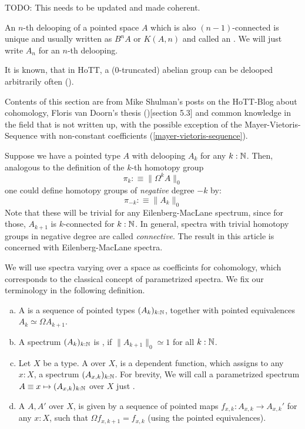 
TODO: This needs to be updated and made coherent.

An $n$-th delooping of a pointed space $A$ which is also $(n-1)$-connected is unique and usually written as $B^nA$ or $K(A,n)$ and called an .
We will just write $A_n$ for an $n$-th delooping.

It is known, that in HoTT, a (0-truncated) abelian group can be delooped arbitrarily often (\cite{LicataFinster}).

Contents of this section are from Mike Shulman's posts on the HoTT-Blog about cohomology,
Floris van Doorn's thesis (\cite{floris-thesis})[section 5.3]
and common knowledge in the field that is not written up,
with the possible exception of the Mayer-Vietoris-Sequence with non-constant coefficients (\cref{mayer-vietoris-sequence}).

Suppose we have a pointed type $A$ with delooping $A_k$ for any $k:\mathbb{N}$.
Then, analogous to the definition of the $k$-th homotopy group
\[ \pi_k:\equiv\|\Omega^kA \|_0 \]
one could define homotopy groups of \emph{negative} degree $-k$ by:
\[ \pi_{-k}:\equiv\|A_k \|_0 \]
Note that these will be trivial for any Eilenberg-MacLane spectrum, since for those, $A_{k+1}$ is $k$-connected for $k:\mathbb{N}$.
In general, spectra with trivial homotopy groups in negative degree are called \emph{connective}.
The result in this article is concerned with Eilenberg-MacLane spectra.

We will use spectra varying over a space as coefficints for cohomology,
which corresponds to the classical concept of parametrized spectra.
We fix our terminology in the following definition.

\begin{definition}
  \begin{enumerate}[(a)]
  \item A  is a sequence of pointed types $(A_k)_{k:\mathbb{N}}$, together with pointed equivalences $A_k\simeq \Omega A_{k+1}$.
  \item A spectrum $(A_k)_{k:\mathbb{N}}$ is , if $\|A_{k+1}\|_0\simeq 1$ for all $k:\mathbb{N}$.
  \item Let $X$ be a type. A  over $X$, is a dependent function, which assigns to any $x:X$, a spectrum $(A_{x,k})_{k:\mathbb{N}}$.
    For brevity, We will call a parametrized spectrum $A\equiv x\mapsto (A_{x,k})_{k:\mathbb{N}}$ over $X$ just .
  \item A  $A,A'$ over $X$, is given by a sequence of pointed maps $f_{x,k}:A_{x,k}\to A_{x,k}'$ for any $x:X$,
    such that $\Omega f_{x,k+1}=f_{x,k}$ (using the pointed equivalences).
  \end{enumerate}
\end{definition}

